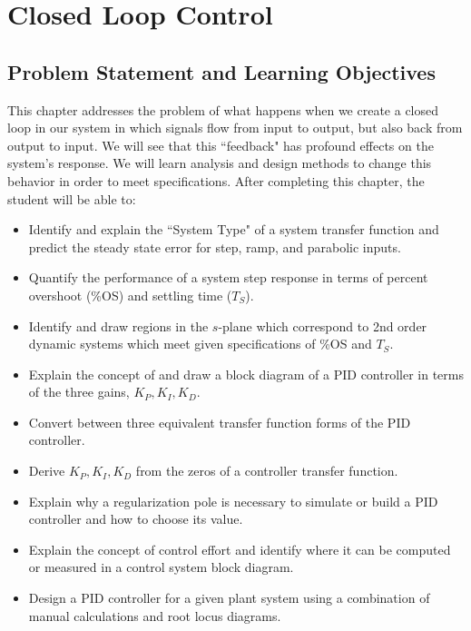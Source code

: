 %
%
%

\chapter{Closed Loop Control}

\section{Problem Statement and Learning Objectives}


This chapter addresses the problem of what happens when we create a closed loop in our system in which signals flow from input to output, but also back from output to input.  We will see that this ``feedback" has profound effects on the system's response.  We will learn analysis and design methods to change this behavior in order to meet specifications.  After completing this chapter, the student will be able to:

\begin{itemize}

  \item Identify and explain the ``System Type" of a system transfer function and predict the steady state error for step, ramp, and parabolic inputs.

  \item Quantify the performance of a system step response in terms of percent overshoot (\%OS) and settling time ($T_S$).

  \item Identify and draw regions in the $s$-plane which correspond to 2nd order dynamic systems which meet given specifications of \%OS and $T_S$.

  \item Explain the concept of and draw a block diagram of a PID controller in terms of the three gains, $K_P, K_I, K_D$.

  \item Convert between three equivalent transfer function forms of the PID controller.

  \item Derive $K_P, K_I, K_D$ from the zeros of a controller transfer function.
  
  \item Explain why a regularization pole is necessary to simulate or build a PID controller and how to choose its value.

  \item Explain the concept of control effort and identify where it can be computed or measured in a control system block diagram.

  \item Design a PID controller for a given plant system using a combination of manual calculations and  root locus diagrams.


\end{itemize}




